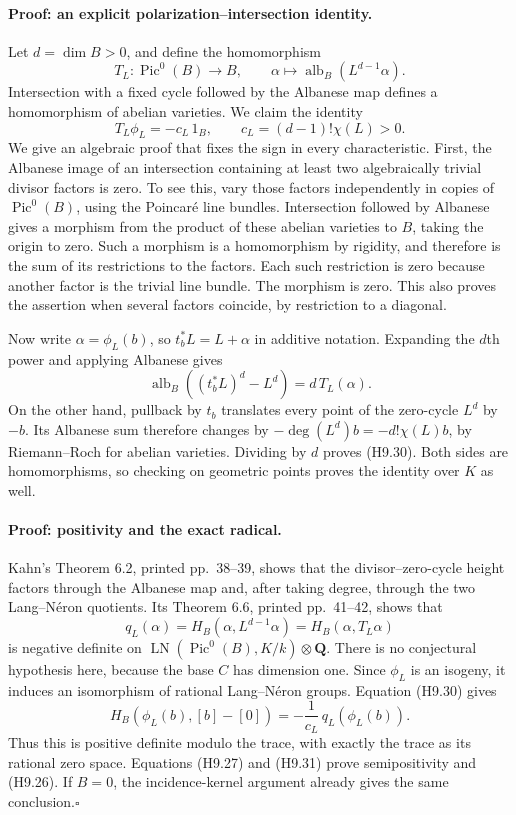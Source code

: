 \documentclass[11pt,a4paper]{article}
\begin{document}
\paragraph{Proof: an explicit polarization--intersection identity.}
Let $d=\dim B>0$, and define the homomorphism
\[
 T_L:\operatorname{Pic}^0(B)\longrightarrow B,
 \qquad \alpha\longmapsto
        \operatorname{alb}_B(L^{d-1}\alpha).
\]
Intersection with a fixed cycle followed by the Albanese map defines
a homomorphism of abelian varieties. We claim the identity
\[
 T_L\phi_L=-c_L\,1_B,
 \qquad c_L=(d-1)!\chi(L)>0.                                 \tag{H9.30}
\]
We give an algebraic proof that fixes the sign in every characteristic.
First, the Albanese image of an intersection containing at least two
algebraically trivial divisor factors is zero. To see this, vary those
factors independently in copies of $\operatorname{Pic}^0(B)$, using
the Poincar\'e line bundles. Intersection followed by Albanese gives a
morphism from the product of these abelian varieties to $B$, taking
the origin to zero. Such a morphism is a homomorphism by rigidity, and
therefore is the sum of its restrictions to the factors. Each such
restriction is zero because another factor is the trivial line bundle.
The morphism is zero. This also proves the assertion when several
factors coincide, by restriction to a diagonal.

Now write $\alpha=\phi_L(b)$, so $t_b^*L=L+\alpha$ in additive
notation. Expanding the $d$th power and applying Albanese gives
\[
 \operatorname{alb}_B((t_b^*L)^d-L^d)=d\,T_L(\alpha).
\]
On the other hand, pullback by $t_b$ translates every point of the
zero-cycle $L^d$ by $-b$. Its Albanese sum therefore changes by
$-\deg(L^d)b=-d!\chi(L)b$, by Riemann--Roch for abelian varieties.
Dividing by $d$ proves (H9.30). Both sides are homomorphisms, so
checking on geometric points proves the identity over $K$ as well.

\paragraph{Proof: positivity and the exact radical.}
Kahn's Theorem 6.2, printed pp.~38--39, shows that the divisor--zero-cycle
height factors through the Albanese map and, after taking degree, through
the two Lang--N\'eron quotients. Its Theorem 6.6, printed pp.~41--42,
shows that
\[
 q_L(\alpha)=H_B(\alpha,L^{d-1}\alpha)
             =H_B(\alpha,T_L\alpha)
\]
is negative definite on
$\operatorname{LN}(\operatorname{Pic}^0(B),K/k)\otimes\mathbf Q$.
There is no conjectural hypothesis here, because the base $C$ has
dimension one. Since $\phi_L$ is an isogeny, it induces an isomorphism
of rational Lang--N\'eron groups. Equation (H9.30) gives
\[
 H_B(\phi_L(b),[b]-[0])
       =-\frac{1}{c_L}\,q_L(\phi_L(b)).                     \tag{H9.31}
\]
Thus this is positive definite modulo the trace, with exactly the trace
as its rational zero space. Equations (H9.27) and (H9.31) prove
semipositivity and (H9.26). If $B=0$, the incidence-kernel argument
already gives the same conclusion.\hfill$\square$
\end{document}

